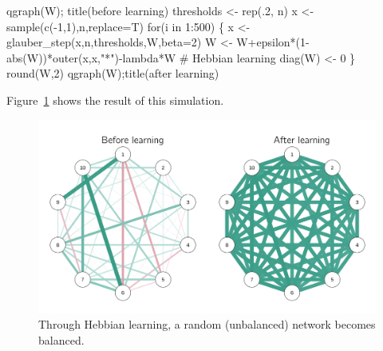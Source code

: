 \documentclass[
  a4paper,
  DIV=11,
  numbers=noendperiod,
  oneside]{scrreprt}
\newenvironment{Shaded}{\begin{snugshade}}{\end{snugshade}}
\newcommand{\AttributeTok}[1]{\textcolor[rgb]{0.40,0.45,0.13}{#1}}
\newcommand{\CommentTok}[1]{\textcolor[rgb]{0.37,0.37,0.37}{#1}}
\newcommand{\ControlFlowTok}[1]{\textcolor[rgb]{0.00,0.23,0.31}{#1}}
\newcommand{\DecValTok}[1]{\textcolor[rgb]{0.68,0.00,0.00}{#1}}
\newcommand{\FunctionTok}[1]{\textcolor[rgb]{0.28,0.35,0.67}{#1}}
\newcommand{\NormalTok}[1]{\textcolor[rgb]{0.00,0.23,0.31}{#1}}
\newcommand{\OtherTok}[1]{\textcolor[rgb]{0.00,0.23,0.31}{#1}}
\newcommand{\SpecialCharTok}[1]{\textcolor[rgb]{0.37,0.37,0.37}{#1}}
\newcommand{\StringTok}[1]{\textcolor[rgb]{0.13,0.47,0.30}{#1}}
\begin{document}
\begin{Shaded}
\begin{Highlighting}[]
\FunctionTok{qgraph}\NormalTok{(W); }\FunctionTok{title}\NormalTok{(}\StringTok{\textquotesingle{}before learning\textquotesingle{}}\NormalTok{)}
\NormalTok{thresholds }\OtherTok{\textless{}{-}} \FunctionTok{rep}\NormalTok{(.}\DecValTok{2}\NormalTok{, n)}
\NormalTok{x }\OtherTok{\textless{}{-}} \FunctionTok{sample}\NormalTok{(}\FunctionTok{c}\NormalTok{(}\SpecialCharTok{{-}}\DecValTok{1}\NormalTok{,}\DecValTok{1}\NormalTok{),n,}\AttributeTok{replace=}\NormalTok{T)}
\ControlFlowTok{for}\NormalTok{(i }\ControlFlowTok{in} \DecValTok{1}\SpecialCharTok{:}\DecValTok{500}\NormalTok{)}
\NormalTok{\{}
\NormalTok{x }\OtherTok{\textless{}{-}} \FunctionTok{glauber\_step}\NormalTok{(x,n,thresholds,W,}\AttributeTok{beta=}\DecValTok{2}\NormalTok{)}
\NormalTok{W }\OtherTok{\textless{}{-}}\NormalTok{ W}\SpecialCharTok{+}\NormalTok{epsilon}\SpecialCharTok{*}\NormalTok{(}\DecValTok{1}\SpecialCharTok{{-}}\FunctionTok{abs}\NormalTok{(W))}\SpecialCharTok{*}\FunctionTok{outer}\NormalTok{(x,x,}\StringTok{"*"}\NormalTok{)}\SpecialCharTok{{-}}\NormalTok{lambda}\SpecialCharTok{*}\NormalTok{W }\CommentTok{\# Hebbian learning}
\FunctionTok{diag}\NormalTok{(W) }\OtherTok{\textless{}{-}} \DecValTok{0}
\NormalTok{\}}
\FunctionTok{round}\NormalTok{(W,}\DecValTok{2}\NormalTok{)}
\FunctionTok{qgraph}\NormalTok{(W);}\FunctionTok{title}\NormalTok{(}\StringTok{\textquotesingle{}after learning\textquotesingle{}}\NormalTok{)}
\end{Highlighting}
\end{Shaded}

Figure~\ref{fig-ch6-img14-old-83} shows the result of this simulation.

\begin{figure}

{\centering \includegraphics{media/ch6/fig-ch6-img14-old-83.png}

}

\caption{\label{fig-ch6-img14-old-83}Through Hebbian learning, a random
(unbalanced) network becomes balanced.}

\end{figure}
\end{document}
